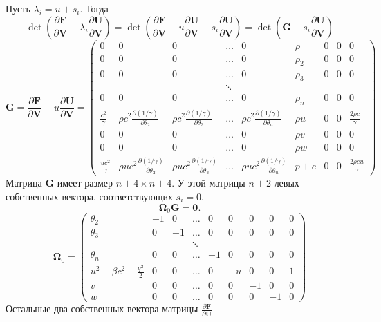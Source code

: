\documentclass[12pt]{article}
\newcommand{\pd}[2]{\frac{\partial #1}{\partial #2}}
\newcommand{\bvec}[1]{\boldsymbol{\mathbf{#1}}}
\begin{document}
Пусть $\lambda_i = u + s_i$. Тогда
\[
\operatorname{det}\left(
\pd{\bvec F}{\bvec V} - \lambda_i \pd{\bvec U}{\bvec V}
\right) =
\operatorname{det}\left(
\pd{\bvec F}{\bvec V} - u \pd{\bvec U}{\bvec V} - s_i \pd{\bvec U}{\bvec V}
\right) = 
\operatorname{det}\left(
\bvec G - s_i \pd{\bvec U}{\bvec V}
\right)
\]
\[
\bvec G = \pd{\bvec F}{\bvec V} - u \pd{\bvec U}{\bvec V} =
\begin{pmatrix}
0 & 0 & 0 & \dots & 0 & \rho & 0 & 0 & 0\\
0 & 0 & 0 & \dots & 0 & \rho_2 & 0 & 0 & 0\\
0 & 0 & 0 & \dots & 0 & \rho_3 & 0 & 0 & 0\\
 &  &  & \ddots\\
0 & 0 & 0 & \dots & 0 & \rho_n & 0 & 0 & 0\\ 
\frac{c^2}{\gamma} & 
\rho c^2\pd{(1/\gamma)}{\theta_2} & 
\rho c^2\pd{(1/\gamma)}{\theta_3} & 
\dots & 
\rho c^2\pd{(1/\gamma)}{\theta_n} & 
\rho u & 0 & 0 & \frac{2\rho c}{\gamma} \\ 
0 & 0 & 0 & \dots & 0 & \rho v & 0 & 0 & 0\\ 
0 & 0 & 0 & \dots & 0 & \rho w & 0 & 0 & 0\\ 
\frac{uc^2}{\gamma} & 
\rho u c^2 \pd{(1/\gamma)}{\theta_2} & 
\rho u c^2 \pd{(1/\gamma)}{\theta_3} & \dots & 
\rho u c^2 \pd{(1/\gamma)}{\theta_n} & p + e & 0 & 0 & \frac{2\rho c u}{\gamma}
\end{pmatrix}
\]
Матрица $\bvec G$ имеет размер $n+4 \times n+4$. У этой матрицы $n+2$ левых собственных вектора, 
соответствующих $s_i = 0$.
\[
\bvec \Omega_{0} \bvec G = \bvec 0.
\]
\[
\bvec \Omega_{0} = \begin{pmatrix}
\theta_2 & -1 & 0 & \dots & 0 & 0 & 0 & 0 & 0\\
\theta_3 & 0 & -1 & \dots & 0 & 0 & 0 & 0 & 0\\
&&&\ddots\\
\theta_n & 0 & 0 & \dots & -1 & 0 & 0 & 0 & 0\\
u^2 - \beta c^2 - \frac{q^2}{2}  &
0 & 0 & \dots & 0 & -u & 0 & 0 & 1\\
v & 0 & 0 & \dots & 0 & 0 & -1 & 0 & 0\\
w & 0 & 0 & \dots & 0 & 0 & 0 & -1 & 0
\end{pmatrix}
\]
Остальные два собственных вектора матрицы $\pd{\bvec F}{\bvec U}$
\end{document}
